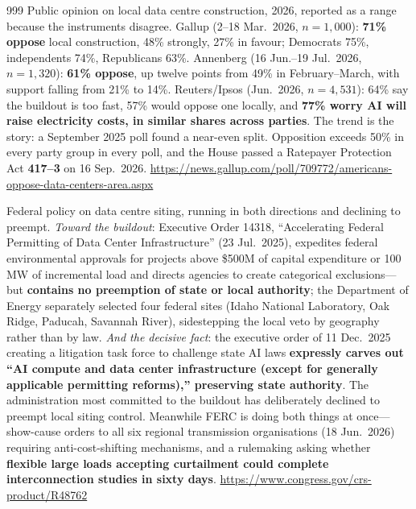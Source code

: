 \begin{thebibliography}{999}
 Public opinion on local data centre construction, 2026, reported as a range because the instruments disagree. Gallup (2--18 Mar.\ 2026, $n=1{,}000$): \textbf{71\% oppose} local construction, 48\% strongly, 27\% in favour; Democrats 75\%, independents 74\%, Republicans 63\%. Annenberg (16 Jun.--19 Jul.\ 2026, $n=1{,}320$): \textbf{61\% oppose}, up twelve points from 49\% in February--March, with support falling from 21\% to 14\%. Reuters/Ipsos (Jun.\ 2026, $n=4{,}531$): 64\% say the buildout is too fast, 57\% would oppose one locally, and \textbf{77\% worry AI will raise electricity costs, in similar shares across parties}. The trend is the story: a September 2025 poll found a near-even split. Opposition exceeds 50\% in every party group in every poll, and the House passed a Ratepayer Protection Act \textbf{417--3} on 16 Sep.\ 2026. \url{https://news.gallup.com/poll/709772/americans-oppose-data-centers-area.aspx}

 Federal policy on data centre siting, running in both directions and declining to preempt. \emph{Toward the buildout}: Executive Order 14318, ``Accelerating Federal Permitting of Data Center Infrastructure'' (23 Jul.\ 2025), expedites federal environmental approvals for projects above \$500M of capital expenditure or 100\,MW of incremental load and directs agencies to create categorical exclusions---but \textbf{contains no preemption of state or local authority}; the Department of Energy separately selected four federal sites (Idaho National Laboratory, Oak Ridge, Paducah, Savannah River), sidestepping the local veto by geography rather than by law. \emph{And the decisive fact}: the executive order of 11 Dec.\ 2025 creating a litigation task force to challenge state AI laws \textbf{expressly carves out ``AI compute and data center infrastructure (except for generally applicable permitting reforms),'' preserving state authority}. The administration most committed to the buildout has deliberately declined to preempt local siting control. Meanwhile FERC is doing both things at once---show-cause orders to all six regional transmission organisations (18 Jun.\ 2026) requiring anti-cost-shifting mechanisms, and a rulemaking asking whether \textbf{flexible large loads accepting curtailment could complete interconnection studies in sixty days}. \url{https://www.congress.gov/crs-product/R48762}


\end{thebibliography}
